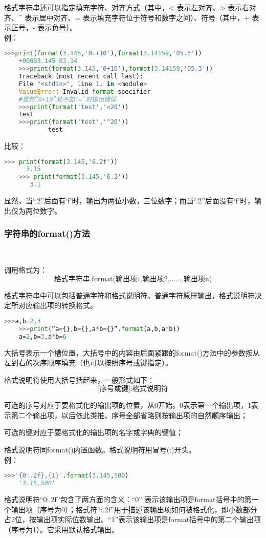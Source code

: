 \documentclass[11pt,a4paper]{article}
\begin{document}
格式字符串还可以指定填充字符、对齐方式（其中，< 表示左对齐、> 表示右对齐、\^{} 表示居中对齐、= 表示填充字符位于符号和数字之间）、符号（其中，+ 表示正号，- 表示负号）。\\
例：
\begin{lstlisting}[language={Python}]
    >>>print(format(3.145,'0=+10'),format(3.14159,'05.3'))
    +00003.145 03.14
    >>>print(format(3.145,'0+10'),format(3.14159,'05.3'))
    Traceback (most recent call last):
    File "<stdin>", line 1, in <module>
    ValueError: Invalid format specifier
    #显然“0+10”处不加‘=’时输出错误
    >>>print(format('test','<20'))
    test
    >>>print(format('test','^20'))
            test
\end{lstlisting}
比较：
\begin{lstlisting}[language={Python}]
    >>> print(format(3.145,'6.2f'))
      3.15
    >>> print(format(3.145,'6.2'))
       3.1
\end{lstlisting}
显然，当“.2”后面有‘f’时，输出为两位小数，三位数字；而当“.2”后面没有‘f’时，输出仅为两位数字。

\subsubsection{字符串的format()方法}~{}

调用格式为：$$\mbox{格式字符串.format(输出项1,输出项2,……,输出项n)}$$

格式字符串中可以包括普通字符和格式说明符。普通字符原样输出，格式说明符决定所对应输出项的转换格式。
\begin{lstlisting}[language={Python}]
    >>>a,b=2,3
    >>>print(“a={},b={},a*b={}”.format(a,b,a*b))
    a=2,b=3,a*b=6
\end{lstlisting}
大括号{}表示一个槽位置，大括号{}中的内容由后面紧跟的format()方法中的参数按从左到右的次序顺序填充（也可以按照序号或键指定）。

格式说明符使用大括号括起来，一般形式如下：
$$\mbox{{[序号或键]:格式说明符}}$$

可选的序号对应于要格式化的输出项的位置，从0开始。0表示第一个输出项，1表示第二个输出项，以后依此类推。序号全部省略则按输出项的自然顺序输出；

可选的键对应于要格式化的输出项的名字或字典的键值；

格式说明符同format()内置函数。格式说明符用冒号(:)开头。\\
例：
\begin{lstlisting}[language={Python}]
    >>>'{0:.2f},{1}'.format(3.145,500)
    '3.15,500'
\end{lstlisting}
格式说明符“{0:.2f}”包含了两方面的含义：“0” 表示该输出项是format括号中的第一个输出项（序号为0）；格式符“:.2f”用于描述该输出项如何被格式化，即小数部分占2位，按输出项实际位数输出。“{1}”表示该输出项是format括号中的第二个输出项（序号为1）。它采用默认格式输出。
\end{document}
